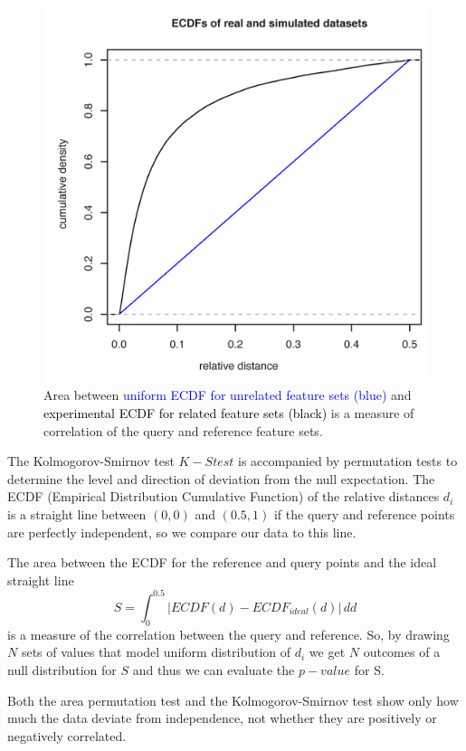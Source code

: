 \documentclass{article}
\begin{document}
\begin{figure}[h!]
	\centering\includegraphics[scale=\picscale]{png/fig6}
	\caption{Area between \textcolor{blue}{uniform ECDF for unrelated feature sets (blue)} and \textcolor{black}{experimental ECDF for related feature sets (black)} is a measure of correlation of the query and reference feature sets.}
\end{figure}

The Kolmogorov-Smirnov test \(K-S test\) is accompanied by permutation tests to determine the level and direction of deviation from the null expectation. The ECDF (Empirical Distribution Cumulative Function) of the relative distances $d_i$ is a straight line between $(0,0)$ and $(0.5,1)$ if the query and reference points are perfectly independent, so we compare our data to this line.

The area between the ECDF for the reference and query points and the ideal straight line \[S=\displaystyle\int_0^{0.5} \! \left| ECDF(d)-ECDF_{ideal}(d) \right| \, dd \] is a measure of the correlation between the query and reference. So, by drawing $N$ sets of values that model uniform distribution of $d_i$ we get $N$ outcomes of a null distribution for $S$ and thus we can evaluate the $p-value$ for S.   

Both the area permutation test and the Kolmogorov-Smirnov test show only how much the data deviate from independence, not whether they are positively or negatively correlated.
\end{document}
